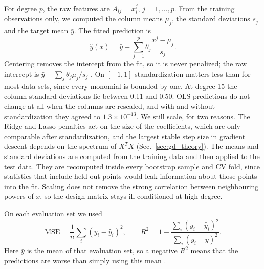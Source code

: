 \documentclass[aps,prb,reprint,superscriptaddress,nofootinbib,longbibliography,floatfix]{revtex4-2}
\newcommand{\MSE}{\mathrm{MSE}}
\begin{document}
For degree $p$, the raw features are $A_{ij}=x_i^j$, $j=1,\ldots,p$. From the training observations only, we computed the column means $\mu_j$, the standard deviations $s_j$ and the target mean $\bar y$. The fitted prediction is
\begin{equation}
\widehat y(x)=\bar y+\sum_{j=1}^p\theta_j\frac{x^j-\mu_j}{s_j}.
\end{equation}
Centering removes the intercept from the fit, so it is never penalized; the raw intercept is $\bar y-\sum_j\theta_j\mu_j/s_j$ \cite[Sec.~3.13]{HjorthJensen2026}. On $[-1,1]$ standardization matters less than for most data sets, since every monomial is bounded by one. At degree 15 the column standard deviations lie between 0.11 and 0.50. OLS predictions do not change at all when the columns are rescaled, and with and without standardization they agreed to $1.3\times10^{-13}$. We still scale, for two reasons. The Ridge and Lasso penalties act on the size of the coefficients, which are only comparable after standardization, and the largest stable step size in gradient descent depends on the spectrum of $X^TX$ (Sec.~\ref{sec:gd_theory}). The means and standard deviations are computed from the training data and then applied to the test data. They are recomputed inside every bootstrap sample and CV fold, since statistics that include held-out points would leak information about those points into the fit. Scaling does not remove the strong correlation between neighbouring powers of $x$, so the design matrix stays ill-conditioned at high degree.

On each evaluation set we used
\begin{equation}
\MSE=\frac1n\sum_i(y_i-\widehat y_i)^2,\qquad
R^2=1-\frac{\sum_i(y_i-\widehat y_i)^2}{\sum_i(y_i-\bar y)^2}.
\end{equation}
Here $\bar y$ is the mean of that evaluation set, so a negative $R^2$ means that the predictions are worse than simply using this mean \cite[Sec.~3.5]{HjorthJensen2026}.
\end{document}
